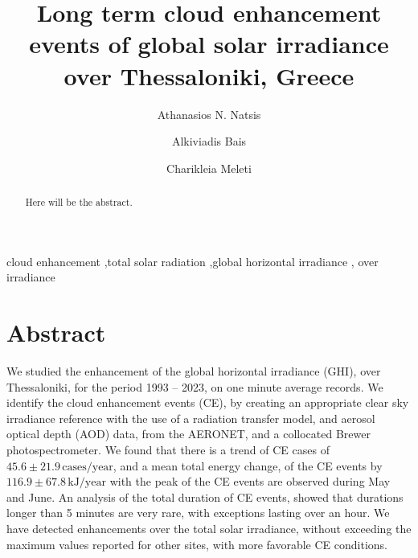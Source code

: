 \documentclass[preprint, 5p,
authoryear]{elsarticle} %
\begin{document}
\begin{frontmatter}

  \title{Long term cloud enhancement events of global solar irradiance
over Thessaloniki, Greece}
    \author[LAP]{Athanasios N. Natsis%
  }
    \author[LAP]{Alkiviadis Bais%
  }
    \author[LAP]{Charikleia Meleti%
  }
  
  \begin{abstract}
  Here will be the abstract.
  \end{abstract}
    \begin{keyword}
    cloud enhancement \sep total solar radiation \sep global horizontal
irradiance \sep 
    over irradiance
  \end{keyword}
  
 \end{frontmatter}

\hypertarget{abstract}{%
\section*{Abstract}\label{abstract}}

We studied the enhancement of the global horizontal irradiance (GHI),
over Thessaloniki, for the period 1993 -- 2023, on one minute average
records. We identify the cloud enhancement events (CE), by creating an
appropriate clear sky irradiance reference with the use of a radiation
transfer model, and aerosol optical depth (AOD) data, from the AERONET,
and a collocated Brewer photospectrometer. We found that there is a
trend of CE cases of \(45.6\pm 21.9\,\text{cases}/\text{year}\), and a
mean total energy change, of the CE events by
\(116.9\pm 67.8\,\text{kJ}/\text{year}\) with the peak of the CE events
are observed during May and June. An analysis of the total duration of
CE events, showed that durations longer than 5 minutes are very rare,
with exceptions lasting over an hour. We have detected enhancements over
the total solar irradiance, without exceeding the maximum values
reported for other sites, with more favorable CE conditions.
\end{document}
